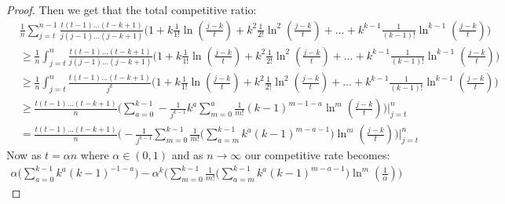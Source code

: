 \begin{proof}
Then we get that the total competitive ratio: 
\begin{align}
     & \frac{1}{n}\sum_{j = t}^{n - 1}
     \frac{t(t - 1)\dots (t - k + 1)}{j(j - 1)\dots(j - k + 1)}(1 + {k}\frac{1}{1!}\ln (\frac{j - k}{t}) + {k ^ 2}\frac{1}{2!}\ln^2(\frac{j - k}{t}) + \dots + {k^{k - 1}}\frac{1}{(k-1)!}\ln^{k - 1}(\frac{j - k}{t})\Big)\\
     & \geq
     \frac{1}{n}\int_{j = t}^{n}
     \frac{t(t - 1)\dots (t - k + 1)}{j(j - 1)\dots(j - k + 1)}\Big(1 + {k}\frac{1}{1!}\ln (\frac{j - k}{t}) + {k^2}\frac{1}{2!}\ln^2(\frac{j - k}{t}) + \dots + {k^{k - 1}}\frac{1}{(k-1)!}\ln^{k - 1}(\frac{j - k}{t})\Big)\\
     & \geq
     \frac{1}{n}\int_{j = t}^{n}
     \frac{t(t - 1)\dots (t - k + 1)}{j^k}\Big(1 + {k}\frac{1}{1!}\ln (\frac{j - k}{t}) + {k^2}\frac{1}{2!}\ln^2(\frac{j - k}{t}) + \dots + {k^{k - 1}}\frac{1}{(k-1)!}\ln^{k - 1}(\frac{j - k}{t})\Big)\\
     & \geq
     \frac{t(t - 1)\dots (t - k + 1)}{n}
     \Big(\sum_{a = 0}^{k - 1}- \frac{1}{j^{k - 1}}{ k ^ a }\sum_{m = 0}^{a}\frac{1}{m!}(k -1)^{m - 1 -a }\ln^m(\frac{j - k}{t}) \Big) \Big|_{j = t}^{n}\\
     & =
     \frac{t(t - 1)\dots (t - k + 1)}{n}\Big(- \frac{1}{j^{k - 1}}\sum_{m = 0}^{k - 1}\frac{1}{m!}\Big(\sum_{a = m}^{k - 1}{k ^ a}(k - 1)^{m - a - 1}\Big)\ln^m{(\frac{j - k}{t})}\Big)\Big|_{j = t}^{n}
\end{align}
Now as $t = \alpha n $ where $\alpha \in (0,1)$ and as $n \xrightarrow{}\infty$ our competitive rate becomes:
\begin{align}
    \alpha \Big(\sum_{a = 0}^{k - 1}{ k ^ a }{(k - 1)}^{-1 - a}\Big) - \alpha^k\Big(\sum_{m=0}^{k - 1}\frac{1}{m!}\Big(\sum_{a = m}^{k - 1}{ k ^ a }(k - 1)^{m - a - 1}\Big)\ln^m(\frac{1}{\alpha})\Big)
\end{align}


\end{proof}
